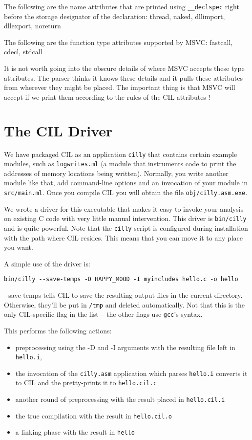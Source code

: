 \documentclass[letterpaper]{article}
\def\t#1{{\tt #1}}
\newcommand\codecolor{\ifhevea\blue\else\fi}
\renewcommand\c[1]{{\codecolor #1}} %
\begin{document}
   The following are the name attributes that are printed using
   \t{\_\_declspec} right before the storage designator of the declaration:
   thread, naked, dllimport, dllexport, noreturn


   The following are the function type attributes supported by MSVC: 
   fastcall, cdecl, stdcall

   It is not worth going into the obscure details of where MSVC accepts these
   type attributes. The parser thinks it knows these details and it pulls
   these attributes from wherever they might be placed. The important thing
   is that MSVC will accept if we print them according to the rules of the CIL
   attributes ! 

\section{The CIL Driver}\label{sec-driver}

 We have packaged CIL as an application \t{cilly} that contains certain
example modules, such as \t{logwrites.ml} (a module
that instruments code to print the addresses of memory locations being
written). Normally, you write another module like that, add command-line
options and an invocation of your module in \t{src/main.ml}. Once you compile
CIL you will obtain the file \t{obj/cilly.asm.exe}. 

 We wrote a driver for this executable that makes it easy to invoke your
analysis on existing C code with very little manual intervention. This driver
is \t{bin/cilly} and is quite powerful. Note that the \t{cilly} script
is configured during installation with the path where CIL resides. This means
that you can move it to any place you want. 

 A simple use of the driver is:
\begin{verbatim}
bin/cilly --save-temps -D HAPPY_MOOD -I myincludes hello.c -o hello
\end{verbatim}

\c{-{}-save-temps} tells CIL to save the resulting output files in the
current directory.  Otherwise, they'll be put in \t{/tmp} and deleted
automatically.  Not that this is the only CIL-specific flag in the
list -- the other flags use \t{gcc}'s syntax.

This performs the following actions: 
\begin{itemize}
\item preprocessing using the -D and -I arguments with the resulting 
  file left in \t{hello.i}, 
\item the invocation of the \t{cilly.asm} application which parses \t{hello.i}
  converts it to CIL and the pretty-prints it to \t{hello.cil.c}
\item another round of preprocessing with the result placed in \t{hello.cil.i}
\item the true compilation with the result in \t{hello.cil.o}
\item a linking phase with the result in \t{hello}
\end{itemize}
 
\end{document}
